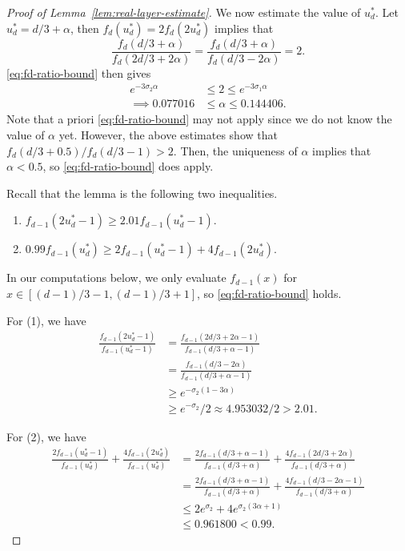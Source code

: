 \documentclass[10pt,a4paper]{amsart}
\begin{document}
\begin{proof}[Proof of Lemma~\ref{lem:real-layer-estimate}]
    We now estimate the value of $u_d^*$. Let $u_d^* = d/3 + \alpha$, then $f_d(u_d^*)=2f_d(2u_d^*)$ implies that
    \[\frac{f_d(d/3+\alpha)}{f_d(2d/3+2\alpha)} = \frac{f_d(d/3+\alpha)}{f_d(d/3-2\alpha)} = 2.\]
    \eqref{eq:fd-ratio-bound} then gives
    \begin{align*}
        e^{-3\sigma_2\alpha} &\leq 2\leq e^{-3\sigma_1\alpha}\\
        \implies 0.077016 &\leq \alpha \leq 0.144406.
    \end{align*}
    Note that a priori \eqref{eq:fd-ratio-bound} may not apply since we do not know the value of $\alpha$ yet. However, the above estimates show that $f_d(d/3+0.5)/f_d(d/3-1)>2$. Then, the uniqueness of $\alpha$ implies that $\alpha<0.5$, so \eqref{eq:fd-ratio-bound} does apply.

    Recall that the lemma is the following two inequalities.
    \begin{enumerate}
        \item $f_{d-1}(2u_d^*-1)\geq 2.01f_{d-1}(u_d^*-1).$
        \item $0.99f_{d-1}(u_d^*)\geq 2f_{d-1}(u_d^*-1)+4f_{d-1}(2u_d^*).$
    \end{enumerate}
    In our computations below, we only evaluate $f_{d-1}(x)$ for $x\in [(d-1)/3-1, (d-1)/3+1]$, so \eqref{eq:fd-ratio-bound} holds.

    For (1), we have
    \begin{align*}
        \frac{f_{d-1}(2u_d^*-1)}{f_{d-1}(u_d^*-1)} &= \frac{f_{d-1}(2d/3+2\alpha-1)}{f_{d-1}(d/3+\alpha-1)} \\
        &= \frac{f_{d-1}(d/3-2\alpha)}{f_{d-1}(d/3+\alpha-1)} \\
        &\geq e^{-\sigma_2(1-3\alpha)}\\
        &\geq e^{-\sigma_2}/2 \approx 4.953032/2 > 2.01.
    \end{align*}

    For (2), we have
    \begin{align*}
        \frac{2f_{d-1}(u_d^*-1)}{f_{d-1}(u_d^*)} + \frac{4f_{d-1}(2u_d^*)}{f_{d-1}(u_d^*)} &= \frac{2f_{d-1}(d/3+\alpha-1)}{f_{d-1}(d/3+\alpha)} + \frac{4f_{d-1}(2d/3+2\alpha)}{f_{d-1}(d/3+\alpha)} \\
        &= \frac{2f_{d-1}(d/3+\alpha-1)}{f_{d-1}(d/3+\alpha)} + \frac{4f_{d-1}(d/3-2\alpha-1)}{f_{d-1}(d/3+\alpha)} \\
        &\leq 2e^{\sigma_2}+4e^{\sigma_2(3\alpha+1)} \\
        &\leq 0.961800 < 0.99.
    \end{align*}

\end{proof}
\end{document}
